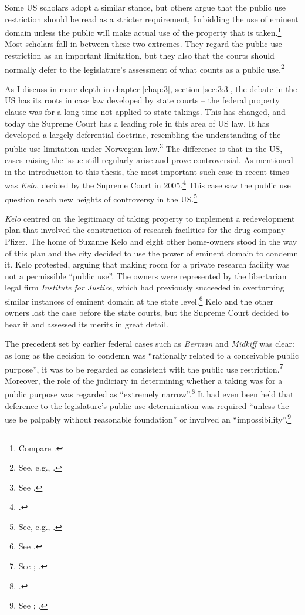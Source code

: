 Some US scholars adopt a similar stance, but others argue that the public use restriction should be read as a stricter requirement, forbidding the use of eminent domain unless the public will make actual use of the property that is taken.\footnote{Compare \cite{bell06,bell09,claeys04,sandefur06}.} Most scholars fall in between these two extremes. They regard the public use restriction as an important limitation, but they also  that the courts should normally defer to the legislature's assessment of what counts as a public use.\footnote{See, e.g., \cite{merrill86,alexander05}.}

As I discuss in more depth in chapter \ref{chap:3}, section \ref{sec:3:3}, the debate in the US has its roots in case law developed by state courts -- the federal property clause was for a long time not applied to state takings. This has changed, and today the Supreme Court has a leading role in this area of US law. It has developed a largely deferential doctrine, resembling the understanding of the public use limitation under Norwegian law.\footnote{See \cite{berman54,midkiff84,kelo05}.} The difference is that in the US, cases raising the issue still regularly arise and prove controversial. As mentioned in the introduction to this thesis, the most important such case in recent times was {\it Kelo}, decided by the Supreme Court in 2005.\footcite{kelo05} This case saw the public use question reach new heights of controversy in the US.\footnote{See, e.g., \cite{somin09}.}

{\it Kelo} centred on the legitimacy of taking property to implement a redevelopment plan that involved the construction of research facilities for the drug company Pfizer. The home of Suzanne Kelo and eight other home-owners stood in the way of this plan and the city decided to use the power of eminent domain to condemn it. Kelo protested, arguing that making room for a private research facility was not a permissible ``public use''. The owners were represented by the libertarian legal firm {\it Institute for Justice}, which had previously succeeded in overturning similar instances of eminent domain at the state level.\footnote{See \cite{justice15}.} Kelo and the other owners lost the case before the state courts, but the Supreme Court decided to hear it and assessed its merits in great detail.

The precedent set by earlier federal cases such as {\it Berman} and {\it Midkiff} was clear: as long as the decision to condemn was ``rationally related to a conceivable public purpose'', it was to be regarded as consistent with the public use restriction.\footnote{See \cite[241]{midkiff84}; \cite{berman54}.} Moreover, the role of the judiciary in determining whether a taking was for a public purpose was regarded as ``extremely narrow''.\footcite[32]{berman54} It had even been held that deference to the legislature's public use determination was required ``unless the use be palpably without reasonable foundation'' or involved an ``impossibility''.\footnote{See \cite[66]{dominion25}; \cite[680]{gettysburg96}.}

